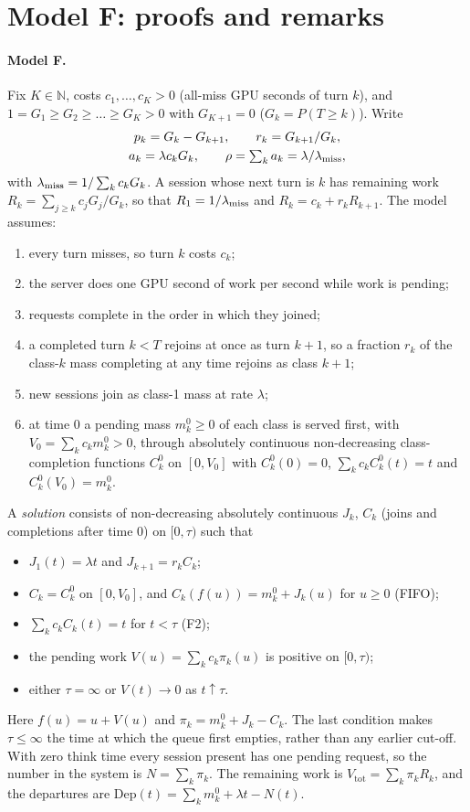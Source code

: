 \section{Model F: proofs and remarks}\label{app:trap}

\paragraph{Model F.} Fix $K\in\mathbb N$, costs $c_1,\dots,c_K>0$ (all-miss GPU seconds of turn $k$), and
$1=G_1\ge G_2\ge\dots\ge G_K>0$ with $G_{K+1}=0$ ($G_k=P(T\ge k)$). Write
\begin{gather*}
p_k=G_k-G_{k+1},\qquad r_k=G_{k+1}/G_k,\\
a_k=\lambda c_kG_k,\qquad \rho=\textstyle\sum_ka_k=\lambda/\lambda_{\mathrm{miss}},
\end{gather*}
with $\lambda_{\mathrm{miss}}=1/\sum_kc_kG_k$. A session whose next turn is $k$ has remaining work $R_k=\sum_{j\ge k}c_jG_j/G_k$, so that
$R_1=1/\lambda_{\mathrm{miss}}$ and $R_k=c_k+r_kR_{k+1}$. The model assumes:
\begin{enumerate}[(F1),leftmargin=*,nosep]
\item every turn misses, so turn $k$ costs $c_k$;
\item the server does one GPU second of work per second while work is pending;
\item requests complete in the order in which they joined;
\item a completed turn $k<T$ rejoins at once as turn $k+1$, so a fraction $r_k$ of the class-$k$ mass completing at any time
rejoins as class $k+1$;
\item new sessions join as class-1 mass at rate $\lambda$;
\item at time 0 a pending mass $m^0_k\ge0$ of each class is served first, with $V_0=\sum_kc_km^0_k>0$, through absolutely
continuous non-decreasing class-completion functions $C^0_k$ on $[0,V_0]$ with $C^0_k(0)=0$, $\sum_kc_kC^0_k(t)=t$ and
$C^0_k(V_0)=m^0_k$.
\end{enumerate}
A \emph{solution} consists of non-decreasing absolutely continuous $J_k$, $C_k$ (joins and completions after time 0) on
$[0,\tau)$ such that
\begin{itemize}[leftmargin=*,nosep]
\item $J_1(t)=\lambda t$ and $J_{k+1}=r_kC_k$;
\item $C_k=C^0_k$ on $[0,V_0]$, and $C_k(f(u))=m^0_k+J_k(u)$ for $u\ge0$ (FIFO);
\item $\sum_kc_kC_k(t)=t$ for $t<\tau$ (F2);
\item the pending work $V(u)=\sum_kc_k\pi_k(u)$ is positive on $[0,\tau)$;
\item either $\tau=\infty$ or $V(t)\to0$ as $t\uparrow\tau$.
\end{itemize}
Here $f(u)=u+V(u)$ and $\pi_k=m^0_k+J_k-C_k$. The last condition makes $\tau\le\infty$ the time at which the queue first
empties, rather than any earlier cut-off. With zero think time every
session present has one pending request, so the number in the system is $N=\sum_k\pi_k$. The remaining work is
$V_{\mathrm{tot}}=\sum_k\pi_kR_k$, and the departures are $\mathrm{Dep}(t)=\sum_km^0_k+\lambda t-N(t)$.

